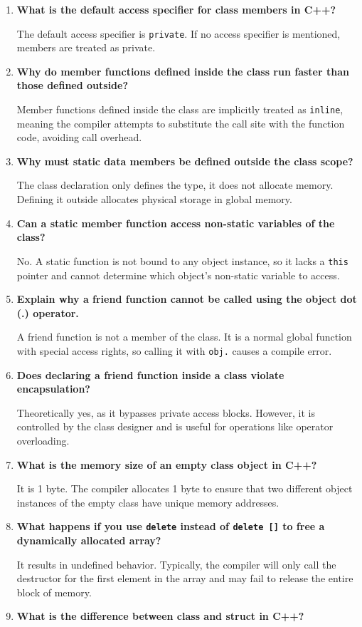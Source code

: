 \documentclass[12pt,a4paper]{article}
\newcommand{\Q}[1]{\textbf{#1}\par\noindent\ignorespaces}
\begin{document}
\begin{tcolorbox}[exambox, title={\textbf{Frequently Asked / Viva Questions}}]
\begin{enumerate}[topsep=0pt, label=\textbf{Q\arabic*.}, itemsep=5pt]
  \item \Q{What is the default access specifier for class members in C++?}
    The default access specifier is \texttt{private}. If no access specifier is mentioned, members are treated as private.
  \item \Q{Why do member functions defined inside the class run faster than those defined outside?}
    Member functions defined inside the class are implicitly treated as \texttt{inline}, meaning the compiler attempts to substitute the call site with the function code, avoiding call overhead.
  \item \Q{Why must static data members be defined outside the class scope?}
    The class declaration only defines the type, it does not allocate memory. Defining it outside allocates physical storage in global memory.
  \item \Q{Can a static member function access non-static variables of the class?}
    No. A static function is not bound to any object instance, so it lacks a \texttt{this} pointer and cannot determine which object's non-static variable to access.
  \item \Q{Explain why a friend function cannot be called using the object dot (.) operator.}
    A friend function is not a member of the class. It is a normal global function with special access rights, so calling it with \texttt{obj.} causes a compile error.
  \item \Q{Does declaring a friend function inside a class violate encapsulation?}
    Theoretically yes, as it bypasses private access blocks. However, it is controlled by the class designer and is useful for operations like operator overloading.
  \item \Q{What is the memory size of an empty class object in C++?}
    It is 1 byte. The compiler allocates 1 byte to ensure that two different object instances of the empty class have unique memory addresses.
  \item \Q{What happens if you use \texttt{delete} instead of \texttt{delete []} to free a dynamically allocated array?}
    It results in undefined behavior. Typically, the compiler will only call the destructor for the first element in the array and may fail to release the entire block of memory.
  \item \Q{What is the difference between class and struct in C++?}

\end{enumerate}
\end{tcolorbox}
\end{document}
